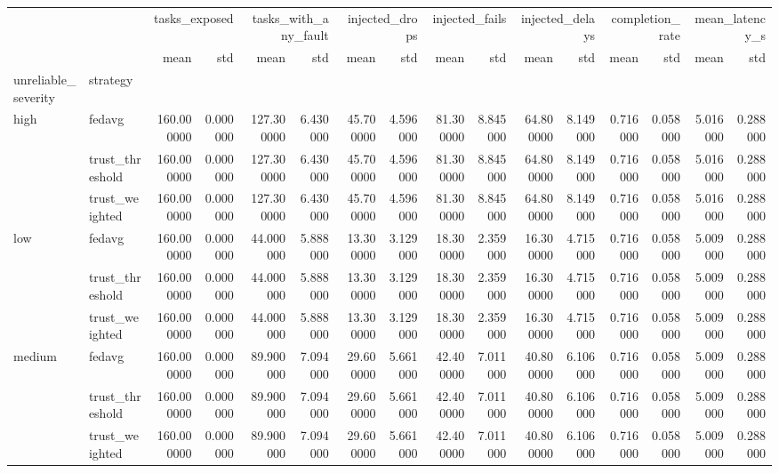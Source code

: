 \begin{tabular}{llrrrrrrrrrrrrrr}
\toprule
 &  & \multicolumn{2}{r}{tasks_exposed} & \multicolumn{2}{r}{tasks_with_any_fault} & \multicolumn{2}{r}{injected_drops} & \multicolumn{2}{r}{injected_fails} & \multicolumn{2}{r}{injected_delays} & \multicolumn{2}{r}{completion_rate} & \multicolumn{2}{r}{mean_latency_s} \\
 &  & mean & std & mean & std & mean & std & mean & std & mean & std & mean & std & mean & std \\
unreliable_severity & strategy &  &  &  &  &  &  &  &  &  &  &  &  &  &  \\
\midrule
\multirow[t]{3}{*}{high} & fedavg & 160.000000 & 0.000000 & 127.300000 & 6.430000 & 45.700000 & 4.596000 & 81.300000 & 8.845000 & 64.800000 & 8.149000 & 0.716000 & 0.058000 & 5.016000 & 0.288000 \\
 & trust_threshold & 160.000000 & 0.000000 & 127.300000 & 6.430000 & 45.700000 & 4.596000 & 81.300000 & 8.845000 & 64.800000 & 8.149000 & 0.716000 & 0.058000 & 5.016000 & 0.288000 \\
 & trust_weighted & 160.000000 & 0.000000 & 127.300000 & 6.430000 & 45.700000 & 4.596000 & 81.300000 & 8.845000 & 64.800000 & 8.149000 & 0.716000 & 0.058000 & 5.016000 & 0.288000 \\
\cline{1-16}
\multirow[t]{3}{*}{low} & fedavg & 160.000000 & 0.000000 & 44.000000 & 5.888000 & 13.300000 & 3.129000 & 18.300000 & 2.359000 & 16.300000 & 4.715000 & 0.716000 & 0.058000 & 5.009000 & 0.288000 \\
 & trust_threshold & 160.000000 & 0.000000 & 44.000000 & 5.888000 & 13.300000 & 3.129000 & 18.300000 & 2.359000 & 16.300000 & 4.715000 & 0.716000 & 0.058000 & 5.009000 & 0.288000 \\
 & trust_weighted & 160.000000 & 0.000000 & 44.000000 & 5.888000 & 13.300000 & 3.129000 & 18.300000 & 2.359000 & 16.300000 & 4.715000 & 0.716000 & 0.058000 & 5.009000 & 0.288000 \\
\cline{1-16}
\multirow[t]{3}{*}{medium} & fedavg & 160.000000 & 0.000000 & 89.900000 & 7.094000 & 29.600000 & 5.661000 & 42.400000 & 7.011000 & 40.800000 & 6.106000 & 0.716000 & 0.058000 & 5.009000 & 0.288000 \\
 & trust_threshold & 160.000000 & 0.000000 & 89.900000 & 7.094000 & 29.600000 & 5.661000 & 42.400000 & 7.011000 & 40.800000 & 6.106000 & 0.716000 & 0.058000 & 5.009000 & 0.288000 \\
 & trust_weighted & 160.000000 & 0.000000 & 89.900000 & 7.094000 & 29.600000 & 5.661000 & 42.400000 & 7.011000 & 40.800000 & 6.106000 & 0.716000 & 0.058000 & 5.009000 & 0.288000 \\
\cline{1-16}
\bottomrule
\end{tabular}
